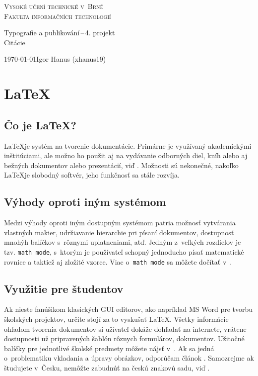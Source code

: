 \documentclass[a4paper, 11pt]{article}
\begin{document}
\begin{titlepage}
    \begin{center}
        {\Huge\textsc{Vysoké učení technické v~Brně}}\\[0.4em]
        {\huge\textsc{Fakulta informačních technologií}}
        
    
    
    {\LARGE 
        Typografie a publikování\,--\,4. projekt}\\[0.3em]
        {\Huge Citácie}
    
    \end{center}
    
    {\Large \today \hfill Igor Hanus (xhanus19)} 
    
\end{titlepage}

\section{\LaTeX}

\subsection{Čo je \LaTeX ?}
\LaTeX je systém na tvorenie dokumentácie. Primárne je využívaný akademickými inštitúciami, ale možno ho použit aj na vydávanie odborných diel, kníh alebo aj bežných dokumentov alebo prezentácií, viď \cite{Springer}.
Možnosti sú nekonečné, nakoľko \LaTeX je slobodný softvér, jeho funkčnosť sa stále rozvíja.  

\subsection{Výhody oproti iným systémom}
Medzi výhody oproti iným dostupným systémom patria možnosť
vytvárania vlastných makier, udržiavanie hierarchie pri písaní dokumentov, dostupnosť mnohýh balíčkov s~rôznymi uplatneniami, atď. Jedným z~veľkých rozdielov je tzv. \texttt{math mode}, s~ktorým je používateľ schopný jednoducho písať matematické rovnice a taktiež aj zložité vzorce. Viac o~\texttt{math mode} sa môžete dočítať v~\cite{SpringerMath}.

\subsection{Využitie pre študentov}
Ak nieste fanúšikom klasických GUI editorov, ako napríklad MS Word pre tvorbu školských projektov, určite stojí za to vyskušať \LaTeX. Všetky informácie ohľadom tvorenia dokumentov si užívateľ dokáže dohľadať na internete, vrátene dostupnosti už pripravených šablón rôznych formulárov, dokumentov. Užitočné balíčky pre jednotlivé školské predmety môžete nájsť v~\cite{unizaLatex}. Ak sa jedná o~problematiku vkladania a úpravy obrázkov, odporúčam článok \cite{vutImages}. Samozrejme ak študujete v~Česku, nemôžte zabudnúť na českú znakovú sadu, viď \cite{czechStyle}. 
	
\end{document}
